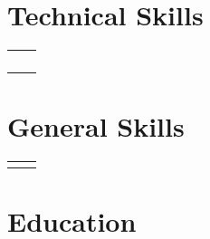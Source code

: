 \documentclass{article}
\begin{document}
\setlength{\parskip}{0pt}
\maketitle




\section{Technical Skills}
    \begin{flushleft}
        \begin{tabular}{>{\raggedleft\arraybackslash}p{1.25in} >{\raggedright\arraybackslash}p{5.85in}}
             \\
             \\
             \\
             \\
             \\
            
        \end{tabular}
    \end{flushleft}



\section{General Skills}

    \begin{flushleft}
        \begin{tabular}{>{\raggedleft\arraybackslash}p{1.25in} >{\raggedright\arraybackslash}p{5.85in}}
             \\
             \\
            
        \end{tabular}
    \end{flushleft}



\section{Education}
\end{document}
